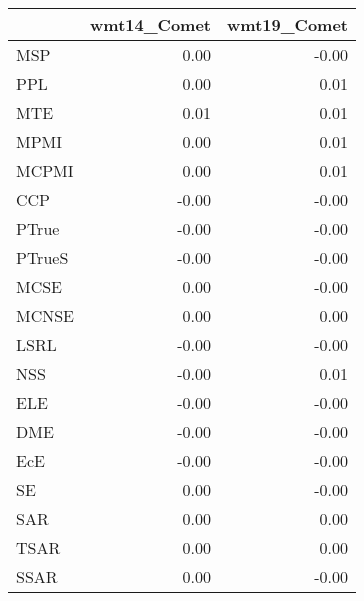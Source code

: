 \begin{tabular}{lrr}
\toprule
 & wmt14\_Comet & wmt19\_Comet \\
\midrule
MSP & 0.00 & -0.00 \\
PPL & 0.00 & 0.01 \\
MTE & 0.01 & 0.01 \\
MPMI & 0.00 & 0.01 \\
MCPMI & 0.00 & 0.01 \\
CCP & -0.00 & -0.00 \\
PTrue & -0.00 & -0.00 \\
PTrueS & -0.00 & -0.00 \\
MCSE & 0.00 & -0.00 \\
MCNSE & 0.00 & 0.00 \\
LSRL & -0.00 & -0.00 \\
NSS & -0.00 & 0.01 \\
ELE & -0.00 & -0.00 \\
DME & -0.00 & -0.00 \\
EcE & -0.00 & -0.00 \\
SE & 0.00 & -0.00 \\
SAR & 0.00 & 0.00 \\
TSAR & 0.00 & 0.00 \\
SSAR & 0.00 & -0.00 \\
\bottomrule
\end{tabular}
